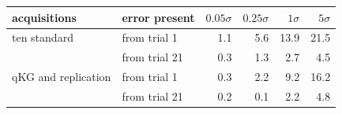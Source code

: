 \begin{tabular}{llrrrr}
\toprule
acquisitions & error present & $0.05\sigma$ & $0.25\sigma$ & $1\sigma$ & $5\sigma$ \\
\midrule
ten standard & from trial 1 & 1.1 & 5.6 & 13.9 & 21.5 \\
 & from trial 21 & 0.3 & 1.3 & 2.7 & 4.5 \\
qKG and replication & from trial 1 & 0.3 & 2.2 & 9.2 & 16.2 \\
 & from trial 21 & 0.2 & 0.1 & 2.2 & 4.8 \\
\bottomrule
\end{tabular}
